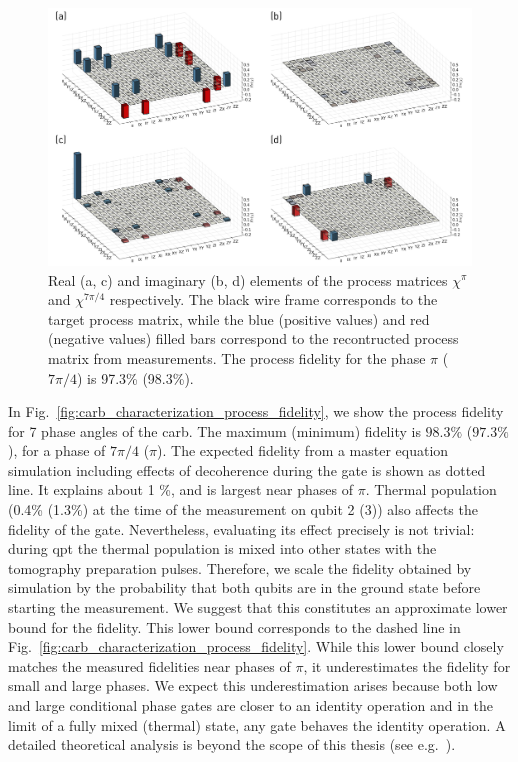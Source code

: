 \begin{figure}[ht]
    \centering
    \includegraphics[width=\textwidth]{chapters/carb_gate/figs/process_tomography_chi_mtx.jpg}
    \caption{Real (a, c) and imaginary (b, d) elements of the process matrices $\chi^\pi$ and $\chi^{7\pi/4}$ respectively. The black wire frame corresponds to the target process matrix, while the blue (positive values) and red (negative values) filled bars correspond to the recontructed process matrix from measurements. The process fidelity for the phase  $\pi$ ($7\pi/4$) is 97.3\% (98.3\%).   }
    \label{fig:carb_characterization_chi_matrices}
\end{figure}

In Fig.~\ref{fig:carb_characterization_process_fidelity}, we show the process fidelity for 7 phase angles of the \gls{carb}. The maximum (minimum) fidelity is $98.3\%$ ($97.3\%$), for a phase of $7\pi/4$ ($\pi$). The expected fidelity from a master equation simulation including effects of decoherence during the gate is shown as dotted line. It explains about 1 \%, and is largest near phases of $\pi$. Thermal population  (0.4\% (1.3\%) at the time of the measurement on qubit 2 (3)) also affects the fidelity of the gate. Nevertheless, evaluating its effect precisely is not trivial: during \gls{qpt} the thermal population is mixed into other states with the tomography preparation pulses. Therefore, we scale the fidelity obtained by simulation by the probability that both qubits are in the ground state before starting the measurement. We suggest that this constitutes an approximate lower bound for the fidelity. This lower bound corresponds to the dashed line in Fig.~\ref{fig:carb_characterization_process_fidelity}. While this lower bound closely matches the measured fidelities near phases of $\pi$, it underestimates the fidelity for small and large phases. We expect this underestimation arises because both low and large conditional phase gates are closer to an identity operation and in the limit of a fully mixed (thermal) state, any gate behaves the identity operation. A detailed theoretical analysis is beyond the scope of this thesis (see e.g.~\cite{Korotkov2013ErrorTomography}).

